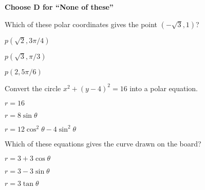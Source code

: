 \documentclass[12pt]{exam}
\newcommand{\<}{(}
\renewcommand{\>}{)}
\begin{document}
\begin{center}
\end{center}
\vspace{0.1in}

\vspace{12pt}

\textbf{Choose D for ``None of these''}

\begin{questions}\setcounter{question}{20}

\question
Which of these polar coordinates gives the point \((-\sqrt3,1)\)?
\begin{choices}
\item \(p(\sqrt2,3\pi/4)\)
\item \(p(\sqrt3,\pi/3)\)
\item \(p(2,5\pi/6)\)
\end{choices}

\question
Convert the circle \(x^2+(y-4)^2=16\) into a polar equation.
\begin{choices}
\item \(r=16\)
\item \(r=8\sin\theta\)
\item \(r=12\cos^2\theta-4\sin^2\theta\)
\end{choices}

\question
Which of these equations gives the curve drawn on the board?
\begin{choices}
\item \(r=3+3\cos\theta\)
\item \(r=3-3\sin\theta\)
\item \(r=3\tan\theta\)
\end{choices}




\end{questions}
\end{document}
